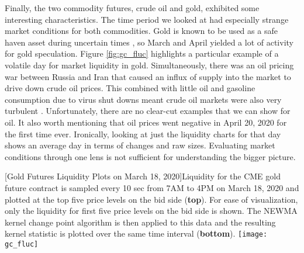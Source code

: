 Finally, the two commodity futures, crude oil and gold, exhibited some interesting characteristics. The time period we looked at had especially strange market conditions for both commodities. Gold is known to be used as a safe haven asset during uncertain times \cite{cheema20202008}, so March and April yielded a lot of activity for gold speculation. Figure \ref{fig:gc_fluc} highlights a particular example of a volatile day for market liquidity in gold. Simultaneously, there was an oil pricing war between Russia and Iran that caused an influx of supply into the market to drive down crude oil prices. This combined with little oil and gasoline consumption due to virus shut downs meant crude oil markets were also very turbulent \cite{albulescu2020coronavirus}. Unfortunately, there are no clear-cut examples that we can show for oil. It also worth mentioning that oil prices went negative in April 20, 2020 for the first time ever. Ironically, looking at just the liquidity charts for that day shows an average day in terms of changes and raw sizes. Evaluating market conditions through one lens is not sufficient for understanding the bigger picture.

\begin{minipage}{0.96\textwidth}
\begin{center} 
[Gold Futures Liquidity Plots on March 18, 2020]{Liquidity for the CME gold future contract is sampled every 10 sec from 7AM to 4PM on March 18, 2020 and plotted at the top five price levels on the bid side (\textbf{top}). For ease of visualization, only the liquidity for first five price levels on the bid side is shown. The NEWMA kernel change point algorithm is then applied to this data and the resulting kernel statistic is plotted over the same time interval (\textbf{bottom}). } 
\texttt{[image: gc\_fluc]} 
\label{fig:gc_fluc} 
\end{center}
\end{minipage}
